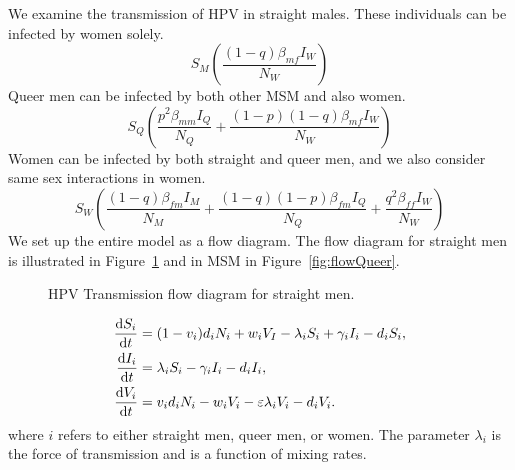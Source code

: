 \documentclass[12pt]{article}
\begin{document}
We examine the transmission of HPV in straight males.  These individuals can be infected by women solely.  
\begin{equation}
S_M\left(\frac{(1-q)\beta_{mf}I_W}{N_W}\right)
\end{equation}
Queer men can be infected by both other MSM and also women.
\begin{equation}
S_Q\left(\frac{p^2\beta_{mm}I_Q}{N_Q}+\frac{(1-p)(1-q)\beta_{mf}I_W}{N_W}\right)
\end{equation}
Women can be infected by both straight and queer men, and we also consider same sex interactions in women. 
\begin{equation}
S_W\left(\frac{(1-q)\beta_{fm}I_M}{N_M}+\frac{(1-q)(1-p)\beta_{fm}I_Q}{N_Q}+\frac{q^2\beta_{ff}I_W}{N_W}\right)
\end{equation}
We set up the entire model as a flow diagram.  The flow diagram for straight men is illustrated in Figure~\ref{fig:flowMen} and in MSM in Figure~\ref{fig:flowQueer}.  
\begin{figure}[h!]
\begin{center}
\end{center}
\caption{HPV Transmission flow diagram for straight men.}
\label{fig:flowMen}
\end{figure}

\begin{align}
\frac{\mathrm{d}S_i}{\mathrm{d}t}&=(1-v_i)d_iN_i + w_iV_I - \lambda_iS_i + \gamma_iI_i - d_iS_i,\\
\frac{\mathrm{d}I_i}{\mathrm{d}t}&= \lambda_iS_i - \gamma_iI_i- d_iI_i,\\
\frac{\mathrm{d}V_i}{\mathrm{d}t}&= v_id_iN_i - w_iV_i - \varepsilon \lambda_iV_i - d_iV_i.
\end{align}
where $i$ refers to either straight men, queer men, or women.  The parameter $\lambda_i$ is the force of transmission and is a function of mixing rates.  
\end{document}
